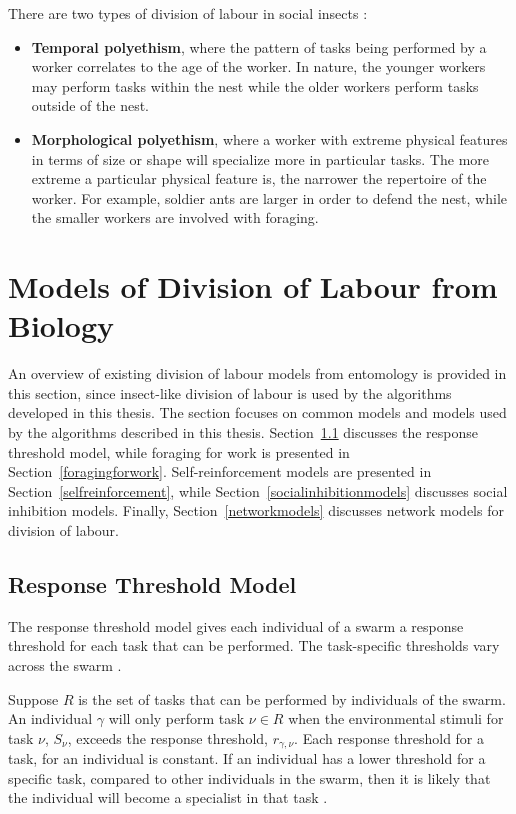 There are two types of division of labour in social insects \cite{beshers2001models}: 
\begin{itemize}
	\item \textbf{Temporal polyethism}, where the pattern of tasks being performed by a worker correlates to the age of the worker. In nature, the younger workers may perform tasks within the nest while the older workers perform tasks outside of the nest.
	\item \textbf{Morphological polyethism}, where a worker with extreme physical features in terms of size or shape will specialize more in particular tasks. The more extreme a particular physical feature is, the narrower the repertoire of the worker. For example, soldier ants are larger in order to defend the nest, while the smaller workers are involved with foraging.
\end{itemize}


\section{Models of Division of Labour from Biology}
\label{modelsofdivisionoflabourbiology}
An overview of existing division of labour models from entomology is provided in this section, since insect-like division of labour is used by the algorithms developed in this thesis. The section focuses on common models and models used by the algorithms described in this thesis. Section~\ref{responsethresholdmodel} discusses the response threshold model, while foraging for work is presented in Section~\ref{foragingforwork}. Self-reinforcement models are presented in Section~\ref{selfreinforcement}, while Section~\ref{socialinhibitionmodels} discusses social inhibition models. Finally, Section~\ref{networkmodels} discusses network models for division of labour.

\subsection{Response Threshold Model}
\label{responsethresholdmodel}

The response threshold model gives each individual of a swarm a response threshold for each task that can be performed. The task-specific thresholds vary across the swarm \cite{robinson1989genetic}.

Suppose $R$ is the set of tasks that can be performed by individuals of the swarm. An individual $\gamma$ will only perform task $\nu \in R$ when the environmental stimuli for task $\nu$, $S_\nu$, exceeds the response threshold, $r_{\gamma,\nu}$. Each response threshold for a task, for an individual is constant. If an individual has a lower threshold for a specific task, compared to other individuals in the swarm, then it is likely that the individual will become a specialist in that task \cite{robinson1989genetic}.

